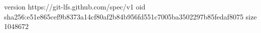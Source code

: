 version https://git-lfs.github.com/spec/v1
oid sha256:e51e865cef9b8373a14cf80af2b84b956fd551c7005ba3502297b85fedaf8075
size 1048672

